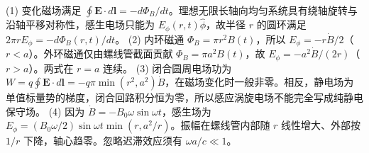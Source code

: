 (1) 变化磁场满足 \(\oint\mathbf E\cdot d\mathbf l=-d\Phi_B/dt\)。理想无限长轴向均匀系统具有绕轴旋转与沿轴平移对称性，感生电场只能为 \(E_\phi(r,t)\hat\phi\)，故半径 \(r\) 的圆环满足 \(2\pi rE_\phi=-d\Phi_B(r,t)/dt\)。
(2) 内环磁通 \(\Phi_B=\pi r^2B(t)\)，所以 \(E_\phi=-r\dot B/2\)（\(r<a\)）。外环磁通仅由螺线管截面贡献 \(\Phi_B=\pi a^2B(t)\)，故 \(E_\phi=-a^2\dot B/(2r)\)（\(r>a\)）。两式在 \(r=a\) 连续。
(3) 闭合圆周电场功为 \(W=q\oint\mathbf E\cdot d\mathbf l=-q\pi\min(r^2,a^2)\dot B\)，在磁场变化时一般非零。相反，静电场为单值标量势的梯度，闭合回路积分恒为零，所以感应涡旋电场不能完全写成纯静电保守场。
(4) 因为 \(\dot B=-B_0\omega\sin\omega t\)，感生场为 \(E_\phi=(B_0\omega/2)\sin\omega t\min(r,a^2/r)\)。振幅在螺线管内部随 \(r\) 线性增大、外部按 \(1/r\) 下降，轴心趋零。忽略迟滞效应须有 \(\omega a/c\ll1\)。
